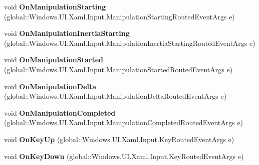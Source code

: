 \begin{DoxyCompactItemize}
void {\bfseries On\+Manipulation\+Starting} (global\+::\+Windows.\+U\+I.\+Xaml.\+Input.\+Manipulation\+Starting\+Routed\+Event\+Args e)
\item 
\mbox{\label{interface_windows_1_1_u_i_1_1_xaml_1_1_controls_1_1_i_control_overrides_a21b1d1b2b1ecdec91300370cf68756eb}} 
void {\bfseries On\+Manipulation\+Inertia\+Starting} (global\+::\+Windows.\+U\+I.\+Xaml.\+Input.\+Manipulation\+Inertia\+Starting\+Routed\+Event\+Args e)
\item 
\mbox{\label{interface_windows_1_1_u_i_1_1_xaml_1_1_controls_1_1_i_control_overrides_ac3442eba714609f27fe4dd677f6f69cf}} 
void {\bfseries On\+Manipulation\+Started} (global\+::\+Windows.\+U\+I.\+Xaml.\+Input.\+Manipulation\+Started\+Routed\+Event\+Args e)
\item 
\mbox{\label{interface_windows_1_1_u_i_1_1_xaml_1_1_controls_1_1_i_control_overrides_a34e586f6a14135e204c81f1e9f6b5e18}} 
void {\bfseries On\+Manipulation\+Delta} (global\+::\+Windows.\+U\+I.\+Xaml.\+Input.\+Manipulation\+Delta\+Routed\+Event\+Args e)
\item 
\mbox{\label{interface_windows_1_1_u_i_1_1_xaml_1_1_controls_1_1_i_control_overrides_ab30d6aba08b80481dbb976080452f0f8}} 
void {\bfseries On\+Manipulation\+Completed} (global\+::\+Windows.\+U\+I.\+Xaml.\+Input.\+Manipulation\+Completed\+Routed\+Event\+Args e)
\item 
\mbox{\label{interface_windows_1_1_u_i_1_1_xaml_1_1_controls_1_1_i_control_overrides_ac591ce0737bcc8e2cf2c6b8bd5621e9d}} 
void {\bfseries On\+Key\+Up} (global\+::\+Windows.\+U\+I.\+Xaml.\+Input.\+Key\+Routed\+Event\+Args e)
\item 
\mbox{\label{interface_windows_1_1_u_i_1_1_xaml_1_1_controls_1_1_i_control_overrides_aeaad1b14fc6776a7f72fc9cd0adfd0bc}} 
void {\bfseries On\+Key\+Down} (global\+::\+Windows.\+U\+I.\+Xaml.\+Input.\+Key\+Routed\+Event\+Args e)

\end{DoxyCompactItemize}

